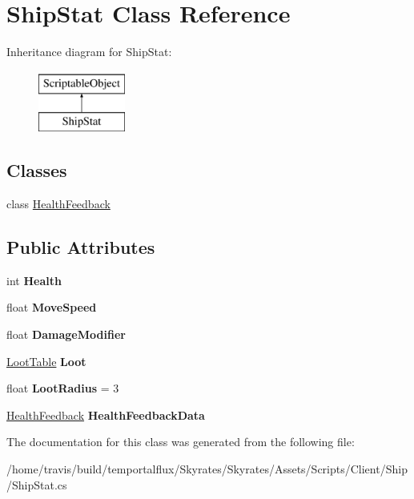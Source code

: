 \hypertarget{class_ship_stat}{\section{Ship\-Stat Class Reference}
\label{class_ship_stat}
}
Inheritance diagram for Ship\-Stat\-:\begin{figure}[H]
\begin{center}
\leavevmode
\includegraphics[height=2.000000cm]{class_ship_stat}
\end{center}
\end{figure}
\subsection*{Classes}
\begin{DoxyCompactItemize}
\item 
class \hyperlink{class_ship_stat_1_1_health_feedback}{Health\-Feedback}
\end{DoxyCompactItemize}
\subsection*{Public Attributes}
\begin{DoxyCompactItemize}
\item 
\hypertarget{class_ship_stat_ab29fff973cecbe0c852a67b70a41bce7}{int {\bfseries Health}}\label{class_ship_stat_ab29fff973cecbe0c852a67b70a41bce7}

\item 
\hypertarget{class_ship_stat_a5eb3933b4e82d370adf8fe3b781b3f5e}{float {\bfseries Move\-Speed}}\label{class_ship_stat_a5eb3933b4e82d370adf8fe3b781b3f5e}

\item 
\hypertarget{class_ship_stat_af6fce7bb672881aa282ca755540f28d1}{float {\bfseries Damage\-Modifier}}\label{class_ship_stat_af6fce7bb672881aa282ca755540f28d1}

\item 
\hypertarget{class_ship_stat_a5c1c8d0ae16df851e395e157bb53d45a}{\hyperlink{class_skyrates_1_1_client_1_1_loot_1_1_loot_table}{Loot\-Table} {\bfseries Loot}}\label{class_ship_stat_a5c1c8d0ae16df851e395e157bb53d45a}

\item 
\hypertarget{class_ship_stat_aa7529f6c48b591b4e61c46dfb18ed8e1}{float {\bfseries Loot\-Radius} = 3}\label{class_ship_stat_aa7529f6c48b591b4e61c46dfb18ed8e1}

\item 
\hypertarget{class_ship_stat_ac7f6b53aa68139139b5fe1ccd8e3da38}{\hyperlink{class_ship_stat_1_1_health_feedback}{Health\-Feedback} {\bfseries Health\-Feedback\-Data}}\label{class_ship_stat_ac7f6b53aa68139139b5fe1ccd8e3da38}

\end{DoxyCompactItemize}


The documentation for this class was generated from the following file\-:\begin{DoxyCompactItemize}
\item 
/home/travis/build/temportalflux/\-Skyrates/\-Skyrates/\-Assets/\-Scripts/\-Client/\-Ship/Ship\-Stat.\-cs\end{DoxyCompactItemize}
